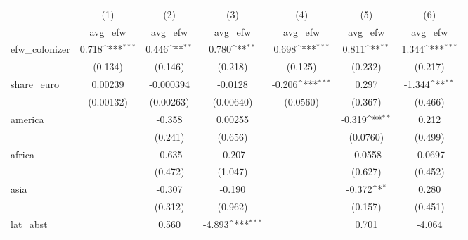 {
\def\sym#1{\ifmmode^{#1}\else\(^{#1}\)\fi}
\begin{tabular}{l*{6}{c}}
\hline\hline
            &\multicolumn{1}{c}{(1)}&\multicolumn{1}{c}{(2)}&\multicolumn{1}{c}{(3)}&\multicolumn{1}{c}{(4)}&\multicolumn{1}{c}{(5)}&\multicolumn{1}{c}{(6)}\\
            &\multicolumn{1}{c}{avg\_efw}&\multicolumn{1}{c}{avg\_efw}&\multicolumn{1}{c}{avg\_efw}&\multicolumn{1}{c}{avg\_efw}&\multicolumn{1}{c}{avg\_efw}&\multicolumn{1}{c}{avg\_efw}\\
\hline
efw\_colonizer&       0.718\sym{***}&       0.446\sym{**} &       0.780\sym{**} &       0.698\sym{***}&       0.811\sym{**} &       1.344\sym{***}\\
            &     (0.134)         &     (0.146)         &     (0.218)         &     (0.125)         &     (0.232)         &     (0.217)         \\
[1em]
share\_euro  &     0.00239         &   -0.000394         &     -0.0128         &      -0.206\sym{***}&       0.297         &      -1.344\sym{**} \\
            &   (0.00132)         &   (0.00263)         &   (0.00640)         &    (0.0560)         &     (0.367)         &     (0.466)         \\
[1em]
america     &                     &      -0.358         &     0.00255         &                     &      -0.319\sym{**} &       0.212         \\
            &                     &     (0.241)         &     (0.656)         &                     &    (0.0760)         &     (0.499)         \\
[1em]
africa      &                     &      -0.635         &      -0.207         &                     &     -0.0558         &     -0.0697         \\
            &                     &     (0.472)         &     (1.047)         &                     &     (0.627)         &     (0.452)         \\
[1em]
asia        &                     &      -0.307         &      -0.190         &                     &      -0.372\sym{*}  &       0.280         \\
            &                     &     (0.312)         &     (0.962)         &                     &     (0.157)         &     (0.451)         \\
[1em]
lat\_abst    &                     &       0.560         &      -4.893\sym{***}&                     &       0.701         &      -4.064         \\

\end{tabular}}
